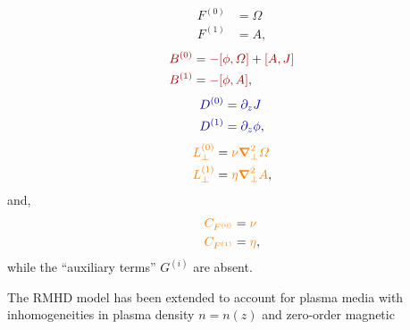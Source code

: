 \documentclass[12pt]{memoir}
\begin{document}
\begin{subequations}
\begin{align}
  F^{(0)} &= \Omega  \label{eq:rmhdfzero}                                                              \\
  F^{(1)} &=  A,     \label{eq:rmhdfone}
\end{align}
\end{subequations}
%
\begin{subequations}
\begin{align}
  {\color{red!65!black}B^{(0)}} &= {\color{red!65!black}-[\phi,\Omega]} + {\color{red!65!black}[A,J]} \label{eq:rmhdbzero} \\
  {\color{red!65!black}B^{(1)}} &= {\color{red!65!black}-[\phi,A]},                                    \label{eq:rmhdbone}
\end{align}
\end{subequations}
%                                   
\begin{subequations}
\begin{align}
  {\color{blue!65!black}D^{(0)}} &= {\color{blue!65!black}\pardz J}                                   \label{eq:rmhddzero} \\
  {\color{blue!65!black}D^{(1)}} &= {\color{blue!65!black}\pardz\phi},                                \label{eq:rmhddone}
\end{align}
\end{subequations}
%
\begin{subequations}
\begin{align}
  {\color{orange}L^{(0)}_\perp} &={\color{orange}\nu \boldsymbol{\nabla}_\perp^2\Omega} \label{eq:rmhdlzero} \\
  {\color{orange}L^{(1)}_\perp} &={\color{orange}\eta\boldsymbol{\nabla}_\perp^2 A},    \label{eq:rmhdlone}
\end{align}
\end{subequations}
%
and,
%
\begin{subequations}
\begin{align}
  {\color{orange}C_{F^{(0)}}} &={\color{orange}\nu }  \label{eq:rmhdczero} \\
  {\color{orange}C_{F^{(1)}}} &={\color{orange}\eta}, \label{eq:rmhdcone}
\end{align}
\end{subequations}
%
while the ``auxiliary terms'' {\color{green!65!black}$G^{(i)}$} are
absent.
%
\par
%
The RMHD model has been extended to account for plasma media with
inhomogeneities in plasma density $n=n(z)$ and zero-order magnetic 
\end{document}
